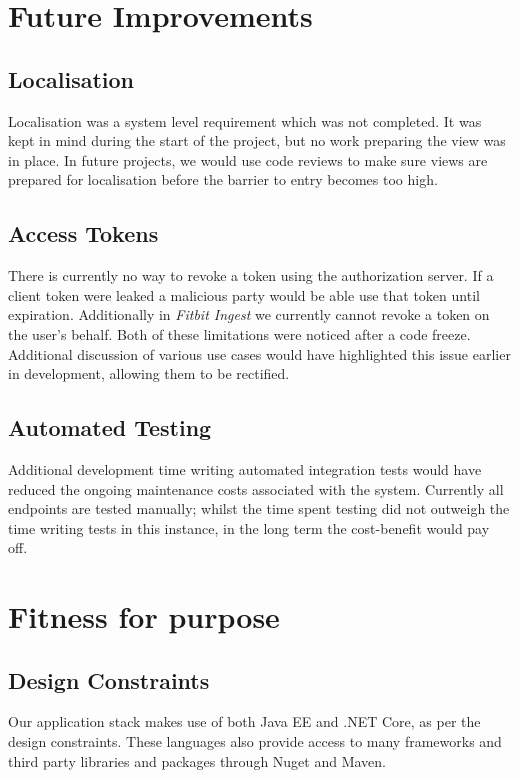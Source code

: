 \section{Future Improvements}

    \subsection{Localisation}
    \par
    Localisation was a system level requirement which was not completed. It was kept in mind during the start of the project, but no work preparing the view was in place. In future projects, we would use code reviews to make sure views are prepared for localisation before the barrier to entry becomes too high.

    \subsection{Access Tokens}
    There is currently no way to revoke a token using the authorization server. If a client token were leaked a malicious party would be able use that token until expiration. Additionally in \textit{Fitbit Ingest} we currently cannot revoke a token on the user's behalf. Both of these limitations were noticed after a code freeze. Additional discussion of various use cases would have highlighted this issue earlier in development, allowing them to be rectified.

    \subsection{Automated Testing}
    \par
    Additional development time writing automated integration tests would have reduced the ongoing maintenance costs associated with the system. Currently all endpoints are tested manually; whilst the time spent testing did not outweigh the time writing tests in this instance, in the long term the cost-benefit would pay off.

\section{Fitness for purpose}
    \subsection{Design Constraints}
    \par
    Our application stack makes use of both Java EE and .NET Core, as per the design constraints. These languages also provide access to many frameworks and third party libraries and packages through Nuget and Maven. 
    

